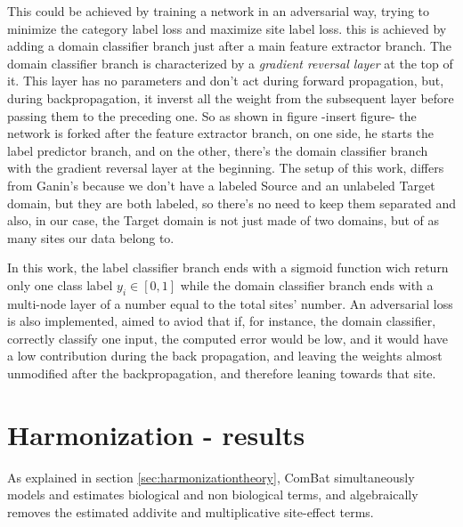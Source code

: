 \documentclass[11pt]{report}
\begin{document}
This could be achieved by training a network in an adversarial way, trying to minimize the category label loss and maximize site label loss.
this is achieved by adding a domain classifier branch just after a main feature extractor branch.
The domain classifier branch is characterized by a \emph{gradient reversal layer} at the top of it.
This layer has no parameters and don't act during forward propagation, but, during backpropagation, it inverst all the weight from the subsequent layer before passing them to the preceding one.
So as shown in figure -insert figure- the network is forked after the feature extractor branch, on one side, he starts the label predictor branch, and on the other, there's the domain classifier branch with the gradient reversal layer at the beginning.
The setup of this work, differs from Ganin's because we don't have a labeled Source and an unlabeled Target domain, but they are both labeled, so there's no need to keep them separated and also, in our case, the Target domain is not just made of two domains, but of as many sites our data belong to.


In this work, the label classifier branch ends with a sigmoid function wich return only one class label $y_i \in [0, 1]$ while the domain classifier branch ends with a multi-node layer of a number equal to the total sites' number.
An adversarial loss is also implemented, aimed to aviod that if, for instance, the domain classifier, correctly classify one input, the computed error would be low, and it would have a low contribution during the back propagation, and leaving the weights almost unmodified after the backpropagation, and therefore leaning towards that site.




\newpage


\chapter{Harmonization - results}


As explained in section \ref{sec:harmonizationtheory}, ComBat simultaneously models and estimates biological and non biological terms, and algebraically removes the estimated addivite and multiplicative site-effect terms.
\end{document}
